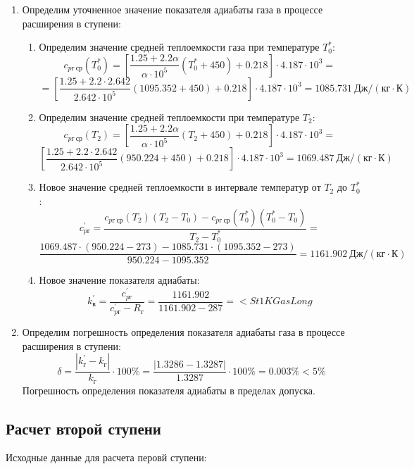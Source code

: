\documentclass[a4paper,10pt]{article}
\begin{document}
\begin{enumerate}
	 \item Определим уточненное значение показателя адиабаты газа в процессе расширения в ступени:
	 
	 \begin{enumerate}
	\item Определим значение средней теплоемкости газа при температуре $T_{0}^*$:
	\[c_{pг\ ср}(T_{0}^*) = \left[ 
	\frac{1.25 +2.2 \alpha}{\alpha \cdot 10^5} (T_{0}^* + 450) + 0.218
	\right] \cdot 4.187 \cdot 10^3= \]
	\[=\left[ 
	\frac{1.25 +2.2 \cdot 2.642}{2.642 \cdot 10^5} (1095.352 + 450) + 0.218
	\right] \cdot 4.187 \cdot 10^3= 1085.731\ Дж / (кг \cdot К) \]
	\item Определим значение средней теплоемкости при температуре $T_2$:
	\[c_{pг\ ср}(T_2) = \left[ 
	\frac{1.25 +2.2 \alpha}{\alpha \cdot 10^5} (T_{2} + 450) + 0.218
	\right] \cdot 4.187 \cdot 10^3= \]
	\[\left[ 
	\frac{1.25 +2.2 \cdot 2.642}{2.642 \cdot 10^5} (950.224 + 450) + 0.218
	\right] \cdot 4.187 \cdot 10^3= 1069.487\ Дж / (кг \cdot К) \]
	\item Новое значение средней теплоемкости в интервале температур от $T_{2}$ до $T_{0}^*$:
	\[c_{pг}^\prime = \frac{
	c_{pг\ ср}(T_{2}) (T_{2} - T_0) - c_{pг\ ср}(T_{0}^*)(T_{0}^* - T_0)
	}{
	T_{2} - T_{0}^*} = \]
	\[\frac{
	1069.487 \cdot (950.224 - 273) - 1085.731 \cdot (1095.352 - 273)
	}{
	950.224 - 1095.352} = 1161.902\ Дж / (кг \cdot К)\]
	\item Новое значение показателя адиабаты:
	\[k_в^\prime = \frac{c_{pг}^\prime}{c_{pг}^\prime - R_г} = \frac{1161.902}{1161.902 - 287} = <St1KGasLong\]
	\end{enumerate}	 
	
	\item Определим погрешность определения показателя адиабаты газа в процессе расширения в ступени:
	$$\delta = \frac{\left| k_г^\prime - k_г \right|}{k_г} \cdot 100 \% = 
	\frac{\left| 1.3286 - 1.3287 \right|}{1.3287} \cdot 100 \% = 
	0.003 \% < 5 \%$$
	Погрешность определения показателя адиабаты в пределах допуска.
\end{enumerate}

\subsection{Расчет второй ступени}
Исходные данные для расчета перовй ступени:
\end{document}
